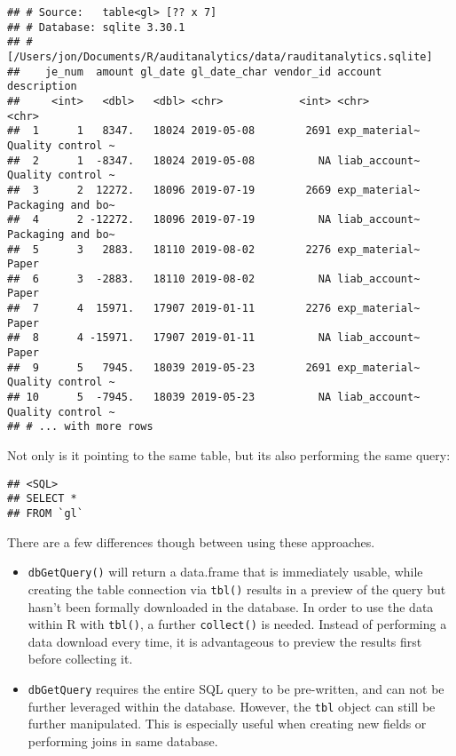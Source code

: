 \documentclass[
]{book}
\newenvironment{Shaded}{\begin{snugshade}}{\end{snugshade}}
\newcommand{\KeywordTok}[1]{\textcolor[rgb]{0.13,0.29,0.53}{\textbf{#1}}}
\newcommand{\NormalTok}[1]{#1}
\newcommand{\OperatorTok}[1]{\textcolor[rgb]{0.81,0.36,0.00}{\textbf{#1}}}
\newcommand{\StringTok}[1]{\textcolor[rgb]{0.31,0.60,0.02}{#1}}
\begin{document}
\begin{verbatim}
## # Source:   table<gl> [?? x 7]
## # Database: sqlite 3.30.1
## #   [/Users/jon/Documents/R/auditanalytics/data/rauditanalytics.sqlite]
##    je_num  amount gl_date gl_date_char vendor_id account       description      
##     <int>   <dbl>   <dbl> <chr>            <int> <chr>         <chr>            
##  1      1   8347.   18024 2019-05-08        2691 exp_material~ Quality control ~
##  2      1  -8347.   18024 2019-05-08          NA liab_account~ Quality control ~
##  3      2  12272.   18096 2019-07-19        2669 exp_material~ Packaging and bo~
##  4      2 -12272.   18096 2019-07-19          NA liab_account~ Packaging and bo~
##  5      3   2883.   18110 2019-08-02        2276 exp_material~ Paper            
##  6      3  -2883.   18110 2019-08-02          NA liab_account~ Paper            
##  7      4  15971.   17907 2019-01-11        2276 exp_material~ Paper            
##  8      4 -15971.   17907 2019-01-11          NA liab_account~ Paper            
##  9      5   7945.   18039 2019-05-23        2691 exp_material~ Quality control ~
## 10      5  -7945.   18039 2019-05-23          NA liab_account~ Quality control ~
## # ... with more rows
\end{verbatim}

Not only is it pointing to the same table, but its also performing the same query:

\begin{Shaded}
\end{Shaded}

\begin{verbatim}
## <SQL>
## SELECT *
## FROM `gl`
\end{verbatim}

There are a few differences though between using these approaches.

\begin{itemize}
\item
  \texttt{dbGetQuery()} will return a data.frame that is immediately usable, while creating the table connection via \texttt{tbl()} results in a preview of the query but hasn't been formally downloaded in the database. In order to use the data within R with \texttt{tbl()}, a further \texttt{collect()} is needed. Instead of performing a data download every time, it is advantageous to preview the results first before collecting it.
\item
  \texttt{dbGetQuery} requires the entire SQL query to be pre-written, and can not be further leveraged within the database. However, the \texttt{tbl} object can still be further manipulated. This is especially useful when creating new fields or performing joins in same database.
\end{itemize}
\end{document}
